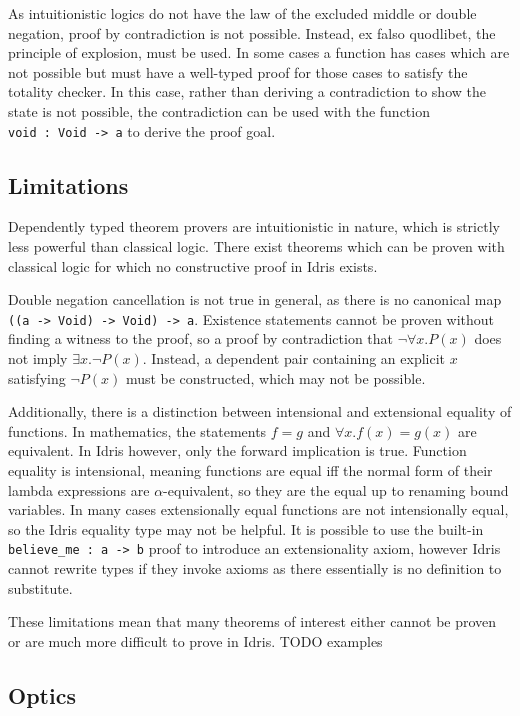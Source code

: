 \documentclass[]{report}
\begin{document}
As intuitionistic logics do not have the law of the excluded middle or double negation, proof by contradiction is not possible. Instead, ex falso quodlibet, the principle of explosion, must be used. In some cases a function has cases which are not possible but must have a well-typed proof for those cases to satisfy the totality checker. In this case, rather than deriving a contradiction to show the state is not possible, the contradiction can be used with the function \texttt{void\ :\ Void\ ->\ a} to derive the proof goal.

\subsection{Limitations}

Dependently typed theorem provers are intuitionistic in nature, which is strictly less powerful than classical logic. There exist theorems which can be proven with classical logic for which no constructive proof in Idris exists.

Double negation cancellation is not true in general, as there is no canonical map \texttt{((a\ ->\ Void)\ ->\ Void)\ ->\ a}. Existence statements cannot be proven without finding a witness to the proof, so a proof by contradiction that $\neg\forall x.P(x)$ does not imply $\exists x.\neg P(x)$. Instead, a dependent pair containing an explicit $x$ satisfying $\neg P(x)$ must be constructed, which may not be possible.

Additionally, there is a distinction between intensional and extensional equality of functions. In mathematics, the statements $f=g$ and $\forall x. f(x)=g(x)$ are equivalent. In Idris however, only the forward implication is true. Function equality is intensional, meaning functions are equal iff the normal form of their lambda expressions are $\alpha$-equivalent, so they are the equal up to renaming bound variables. In many cases extensionally equal functions are not intensionally equal, so the Idris equality type may not be helpful. It is possible to use the built-in \texttt{believe\_me\ :\ a\ ->\ b} proof to introduce an extensionality axiom, however Idris cannot rewrite types if they invoke axioms as there essentially is no definition to substitute.

These limitations mean that many theorems of interest either cannot be proven or are much more difficult to prove in Idris. TODO examples

\subsection{Optics}
\end{document}
